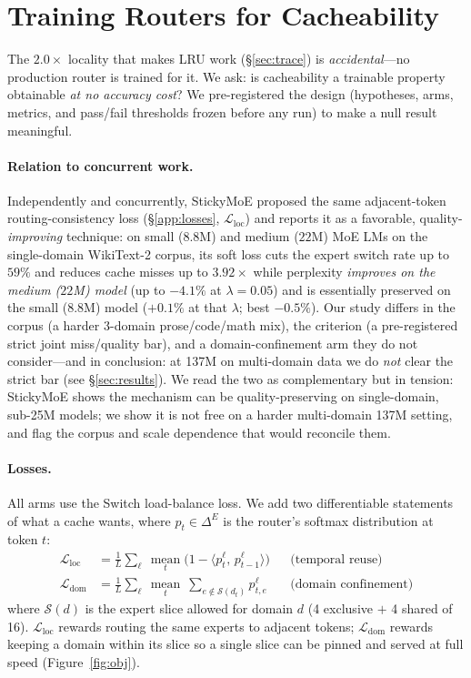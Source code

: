 \documentclass[11pt]{article}
\begin{document}
\section{Training Routers for Cacheability}
\label{sec:sticky}
The $2.0\times$ locality that makes LRU work (\S\ref{sec:trace}) is
\emph{accidental}---no production router is trained for it. We ask: is
cacheability a trainable property obtainable \emph{at no accuracy cost}? We
pre-registered the design (hypotheses, arms, metrics, and pass/fail thresholds
frozen before any run) to make a null result meaningful.

\paragraph{Relation to concurrent work.} Independently and concurrently,
StickyMoE \citep{kayyam2026sticky} proposed the same adjacent-token
routing-consistency loss (\S\ref{app:losses}, $\mathcal{L}_{\text{loc}}$) and
reports it as a favorable, quality-\emph{improving} technique: on small ($8.8$M) and
medium ($22$M) MoE LMs on the single-domain WikiText-2 corpus, its soft loss cuts the
expert switch rate up to $59\%$ and reduces cache misses up to $3.92\times$ while
perplexity \emph{improves on the medium ($22$M) model} (up to $-4.1\%$ at $\lambda{=}0.05$)
and is essentially preserved on the small ($8.8$M) model ($+0.1\%$ at that $\lambda$; best
$-0.5\%$). Our study differs
in the corpus (a harder 3-domain prose/code/math mix), the criterion (a pre-registered
strict joint miss/quality bar), and a domain-confinement arm they do not consider---and
in conclusion: at 137M on multi-domain data we do \emph{not} clear the strict bar (see
\S\ref{sec:results}). We read the two as complementary but in tension: StickyMoE shows
the mechanism can be quality-preserving on single-domain, sub-25M models; we show it is
not free on a harder multi-domain 137M setting, and flag the corpus and scale
dependence that would reconcile them.

\paragraph{Losses.} All arms use the Switch load-balance loss. We add two
differentiable statements of what a cache wants, where $p_t\in\Delta^{E}$ is the
router's softmax distribution at token $t$:
\begin{align}
\mathcal{L}_{\text{loc}} &= \tfrac{1}{L}\sum_{\ell}\ \operatorname*{mean}_t\bigl(1-\langle p_t^{\ell},\,p_{t-1}^{\ell}\rangle\bigr) &&\text{(temporal reuse)}\\
\mathcal{L}_{\text{dom}} &= \tfrac{1}{L}\sum_{\ell}\ \operatorname*{mean}_t\ \textstyle\sum_{e\notin \mathcal{S}(d_t)} p_{t,e}^{\ell} &&\text{(domain confinement)}
\end{align}
where $\mathcal{S}(d)$ is the expert slice allowed for domain $d$ (4 exclusive
$+$ 4 shared of 16). $\mathcal{L}_{\text{loc}}$ rewards routing the same experts
to adjacent tokens; $\mathcal{L}_{\text{dom}}$ rewards keeping a domain within
its slice so a single slice can be pinned and served at full speed
(Figure~\ref{fig:obj}).
\end{document}
